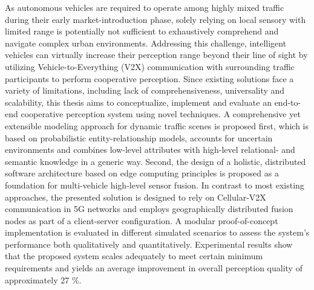As autonomous vehicles are required to operate among highly mixed traffic during their early market-introduction phase, solely relying on local sensory with limited range is potentially not sufficient to exhaustively comprehend and navigate complex urban environments. Addressing this challenge, intelligent vehicles can virtually increase their perception range beyond their line of sight by utilizing Vehicle-to-Everything (V2X) communication with surrounding traffic participants to perform cooperative perception. Since existing solutions face a variety of limitations, including lack of comprehensiveness, universality and scalability, this thesis aims to conceptualize, implement and evaluate an end-to-end cooperative perception system using novel techniques. A comprehensive yet extensible modeling approach for dynamic traffic scenes is proposed first, which is based on probabilistic entity-relationship models, accounts for uncertain environments and combines low-level attributes with high-level relational- and semantic knowledge in a generic way. Second, the design of a holistic, distributed software architecture based on edge computing principles is proposed as a foundation for multi-vehicle high-level sensor fusion. In contrast to most existing approaches, the presented solution is designed to rely on Cellular-V2X communication in 5G networks and employs geographically distributed fusion nodes as part of a client-server configuration. A modular proof-of-concept implementation is evaluated in different simulated scenarios to assess the system's performance both qualitatively and quantitatively. Experimental results show that the proposed system scales adequately to meet certain minimum requirements and yields an average improvement in overall perception quality of approximately 27 \%.